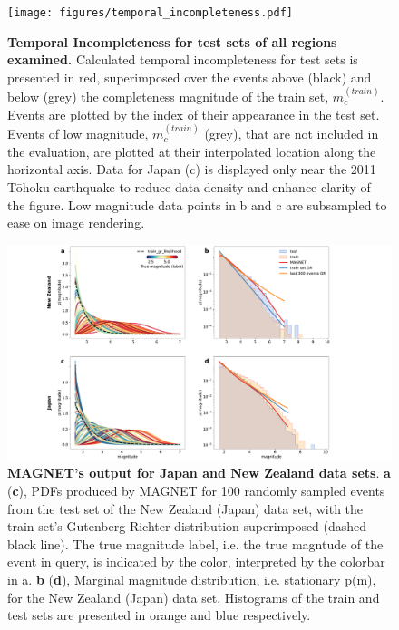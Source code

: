 \documentclass[pdflatex]{sn-jnl}
\begin{document}
\newpage
\begin{figure}[h!]
    \centering
        \texttt{[image: figures/temporal\_incompleteness.pdf]}
    \caption{
    \textbf{Temporal Incompleteness for test sets of all regions examined.} Calculated temporal incompleteness for test sets is presented in red, superimposed over the events above (black) and below (grey) the completeness magnitude of the train set, $m_c^{(train)}$. Events are plotted by the index of their appearance in the test set. Events of low magnitude, $m_c^{(train)}$ (grey), that are not included in the evaluation, are plotted at their interpolated location along the horizontal axis. Data for Japan (c) is displayed only near the 2011 Tōhoku earthquake to reduce data density and enhance clarity of the figure. Low magnitude data points in b and c are subsampled to ease on image rendering.
    }
    \label{fig:temp_incompleteness}
\end{figure}

\newpage
\begin{figure}[h!]
    \centering
    \includegraphics[width=1\textwidth]{figures/raw_results_em.pdf}
    \caption{
        \textbf{MAGNET’s output for Japan and New Zealand data sets}. \textbf{a} (\textbf{c}), PDFs produced by MAGNET for 100 randomly sampled events from the test set of the New Zealand (Japan) data set, with the train set’s Gutenberg-Richter distribution superimposed (dashed black line). The true magnitude label, i.e. the true magntude of the event in query, is indicated by the color, interpreted by the colorbar in a. \textbf{b} (\textbf{d}), Marginal magnitude distribution, i.e. stationary p(m), for the New Zealand (Japan) data set. Histograms of the train and test sets are presented in orange and blue respectively.
    }
    \label{fig:model_output_em}
\end{figure}
\end{document}
